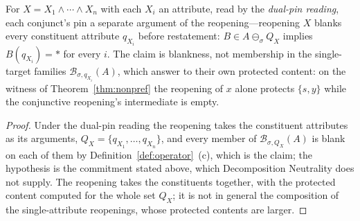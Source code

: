 \begin{lemma}\label{lem:conjunctive}
For $X = X_1 \wedge \cdots \wedge X_n$ with each $X_i$ an attribute, read by the \emph{dual-pin reading}, each conjunct's pin a separate argument of the reopening---reopening $X$ blanks every constituent attribute $q_{X_i}$ before restatement: $B \in A \ominus_{\sigma} Q_X$ implies $B(q_{X_i}) = \ast$ for every $i$. The claim is blankness, not membership in the single-target families $\mathcal{B}_{\sigma, q_{X_i}}(A)$, which answer to their own protected content: on the witness of Theorem~\ref{thm:nonpref} the reopening of $x$ alone protects $\{s, y\}$ while the conjunctive reopening's intermediate is empty. \end{lemma} \begin{proof} Under the dual-pin reading the reopening takes the constituent attributes as its arguments, $Q_X = \{q_{X_1}, \dots, q_{X_n}\}$, and every member of $\mathcal{B}_{\sigma, Q_X}(A)$ is blank on each of them by Definition~\ref{def:operator}~(c), which is the claim; the hypothesis is the commitment stated above, which Decomposition Neutrality does not supply. The reopening takes the constituents together, with the protected content computed for the whole set $Q_X$; it is not in general the composition of the single-attribute reopenings, whose protected contents are larger.
\end{proof}

